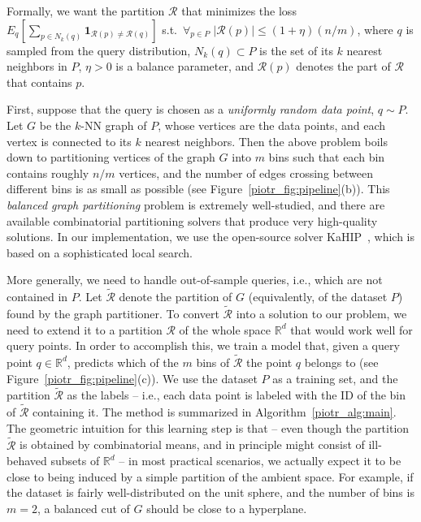 \documentclass[11pt]{article}
\begin{document}
Formally, we want the partition $\mathcal{R}$ that minimizes the loss $E_q\left[\sum_{p\in N_k(q)}\mathbf1_{\mathcal{R}(p)\neq\mathcal{R}(q)}\right]$ s.t.~$\forall_{p\in P}\;|\mathcal{R}(p)|\leq (1+\eta)(n/m)$,
where $q$ is sampled from the query distribution, $N_k(q)\subset P$ is the set of its $k$ nearest neighbors in $P$, $\eta>0$ is a balance parameter, and $\mathcal{R}(p)$ denotes the part of $\mathcal{R}$ that contains $p$.


First, suppose that the query is chosen as a \emph{uniformly random data point}, $q \sim P$. Let $G$ be the $k$-NN graph of $P$, whose vertices are the data points, and each vertex
is connected to its $k$ nearest neighbors. Then the above problem boils down to partitioning vertices of the graph $G$ into $m$ bins such that each bin contains roughly $n / m$ vertices, and the number of edges crossing between different bins is as small as possible (see Figure~\ref{piotr_fig:pipeline}(b)). This \emph{balanced graph partitioning}
problem is extremely well-studied, and there are available combinatorial partitioning solvers that produce very high-quality solutions.
In our implementation, we use the open-source solver KaHIP~\cite{sandersschulz2013}, which is based on a sophisticated local search.

More generally, we need to handle out-of-sample queries, i.e., which are not contained in $P$.
Let $\widetilde{\mathcal{R}}$ denote the partition of $G$ (equivalently, of the dataset $P$) found by the graph partitioner.
To convert $\widetilde{\mathcal{R}}$ into a solution to our problem, we need to extend it to a partition $\mathcal{R}$ of the whole space $\mathbb{R}^d$ that would work well for query points.
In order to accomplish this, we train a model that, given a query point $q \in \mathbb{R}^d$,
predicts which of the $m$ bins of $\widetilde{\mathcal{R}}$ the point $q$ belongs to (see Figure~\ref{piotr_fig:pipeline}(c)). We use the dataset $P$ as a training set,
and the partition $\widetilde{\mathcal{R}}$ as the labels -- i.e., each data point is labeled with the ID of the bin of $\widetilde{\mathcal{R}}$ containing it. 
The method is summarized in Algorithm~\ref{piotr_alg:main}.
The geometric intuition for this learning step is that -- even though the partition $\widetilde{\mathcal{R}}$ is obtained by combinatorial means, and in principle might consist of ill-behaved subsets of $\mathbb{R}^d$ -- in most practical scenarios, we actually expect it to be close to being induced by a simple partition of the ambient space.
For example, if the dataset
is fairly well-distributed on the unit sphere, %
and the number of bins is $m = 2$,
a balanced cut of $G$ should be close to a hyperplane.
\end{document}
